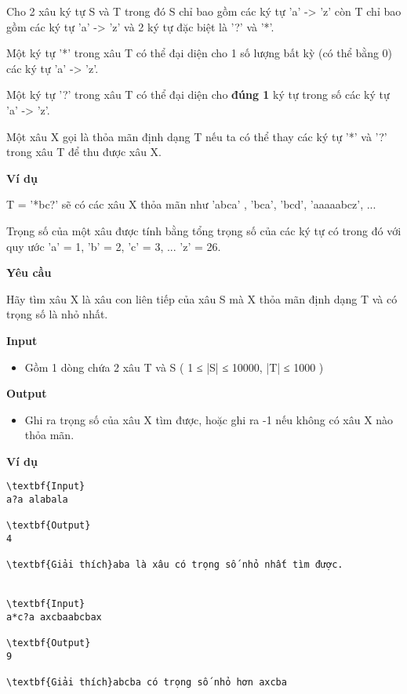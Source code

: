 

Cho 2 xâu ký tự S và T trong đó S chỉ bao gồm các ký tự 'a' -> 'z' còn T chỉ bao gồm các ký tự 'a' -> 'z' và 2 ký tự đặc biệt là '?' và '*'.


Một ký tự '*' trong xâu T có thể đại diện cho 1 số lượng bất kỳ (có thể bằng 0) các ký tự 'a' -> 'z'.


Một ký tự '?' trong xâu T có thể đại diện cho \textbf{ đúng 1 } ký tự trong số các ký tự 'a' -> 'z'.


Một xâu X gọi là thỏa mãn định dạng T nếu ta có thể thay các ký tự '*' và '?' trong xâu T để thu được xâu X.




\textbf{Ví dụ}


T = '*bc?' sẽ có các xâu X thỏa mãn như 'abca' , 'bca', 'bcd', 'aaaaabcz', ...


Trọng số của một xâu được tính bằng tổng trọng số của các ký tự có trong đó với quy ước 'a' = 1, 'b' = 2, 'c' = 3, ... 'z' = 26.

\textbf{Yêu cầu}

Hãy tìm xâu X là xâu con liên tiếp của xâu S mà X thỏa mãn định dạng T và có trọng số là nhỏ nhất.

\textbf{Input }
\begin{itemize}
	\item 

Gồm 1 dòng chứa 2 xâu T và S ( 1 ≤ |S| ≤ 10000, |T| ≤ 1000 )
\end{itemize}

\textbf{Output }
\begin{itemize}
	\item 

Ghi ra trọng số của xâu X tìm được, hoặc ghi ra -1 nếu không có xâu X nào thỏa mãn.
\end{itemize}

\textbf{Ví dụ}
\begin{verbatim}
\textbf{Input}
a?a alabala

\textbf{Output}
4

\textbf{Giải thích}aba là xâu có trọng số nhỏ nhất tìm được.


\textbf{Input}
a*c?a axcbaabcbax

\textbf{Output}
9

\textbf{Giải thích}abcba có trọng số nhỏ hơn axcba\end{verbatim}
